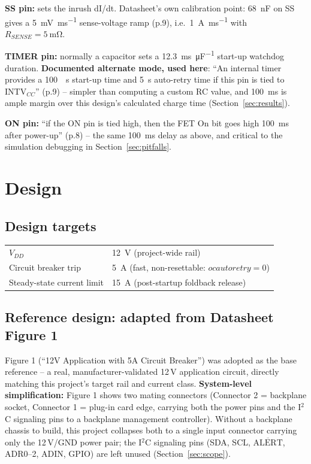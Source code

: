 \documentclass[11pt,letterpaper]{article}
\begin{document}
\textbf{SS pin:} sets the inrush dI/dt. Datasheet's own calibration point: \SI{68}{\nano\farad} on SS
gives a \SI{5}{\milli\volt\per\milli\second} sense-voltage ramp (p.9), i.e.\ \SI{1}{\ampere\per
\milli\second} with $R_{SENSE}=\SI{5}{\milli\ohm}$.

\textbf{TIMER pin:} normally a capacitor sets a \SI{12.3}{\milli\second\per\micro\farad} start-up watchdog
duration. \textbf{Documented alternate mode, used here}: ``An internal timer provides a \SI{100}{\milli
\second} start-up time and \SI{5}{\second} auto-retry time if this pin is tied to INTV$_{CC}$'' (p.9) --
simpler than computing a custom RC value, and \SI{100}{\milli\second} is ample margin over this design's
calculated charge time (Section~\ref{sec:results}).

\textbf{ON pin:} ``if the ON pin is tied high, then the FET On bit goes high \SI{100}{\milli\second} after
power-up'' (p.8) -- the same \SI{100}{\milli\second} delay as above, and critical to the simulation
debugging in Section~\ref{sec:pitfalls}.

\section{Design}
\label{sec:design}

\subsection{Design targets}

\begin{center}
\begin{tabular}{@{}ll@{}}
\toprule
$V_{DD}$ & \SI{12}{\volt} (project-wide rail) \\
Circuit breaker trip & \SI{5}{\ampere} (fast, non-resettable: $ocautoretry=0$) \\
Steady-state current limit & \SI{15}{\ampere} (post-startup foldback release) \\
\bottomrule
\end{tabular}
\end{center}

\subsection{Reference design: adapted from Datasheet Figure 1}

Figure 1 (``12V Application with 5A Circuit Breaker'') was adopted as the base reference -- a real,
manufacturer-validated 12\,V application circuit, directly matching this project's target rail and current
class. \textbf{System-level simplification:} Figure 1 shows two mating connectors (Connector 2 =
backplane socket, Connector 1 = plug-in card edge, carrying both the power pins and the I$^2$C signaling
pins to a backplane management controller). Without a backplane chassis to build, this project collapses
both to a single input connector carrying only the 12\,V/GND power pair; the I$^2$C signaling pins (SDA,
SCL, $\overline{\text{ALERT}}$, ADR0--2, ADIN, GPIO) are left unused (Section~\ref{sec:scope}).
\end{document}
